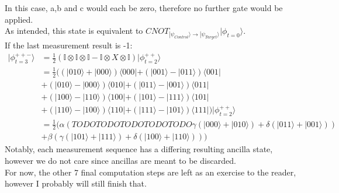In this case, a,b and c would each be zero, therefore no further gate would be applied.\\
As intended, this state is equivalent to 
$CNOT_{|\psi_{Control}\rangle\rightarrow |\psi_{Target}\rangle} |\phi_{t=0}\rangle$.
\\
If the last measurement result is -1:
\begin{align*}
	|\phi^{++-}_{t=3}\rangle 
	&= \frac{1}{2}\left(\mathbb{I}\otimes\mathbb{I}\otimes\mathbb{I}-
	\mathbb{I}\otimes X \otimes \mathbb{I}\right)|\phi^{++}_{t=2}\rangle\\
	&= \frac{1}{2}((|010\rangle + |000\rangle)\langle000|
	+ (|001\rangle-|011\rangle )\langle001|\\
	&+ (|010\rangle-|000\rangle)\langle010|
	+ (|011\rangle-|001\rangle)\langle011|\\
	&+ (|100\rangle-|110\rangle)\langle100|
	+ (|101\rangle-|111\rangle)\langle101|\\
	&+ (|110\rangle-|100\rangle)\langle110|
	+ (|111\rangle-|101\rangle)\langle111|)
	|\phi^{++}_{t=2}\rangle\\
	&= \frac{1}{2}(\alpha \left( 
	TODOTODOTODOTODOTODO
	\gamma (|000\rangle + |010\rangle)+
	\delta (|011\rangle + |001\rangle) \right) \\
	&+ \beta \left( 
	\gamma (|101\rangle + |111\rangle)+
	\delta (|100\rangle + |110\rangle) \right))
\end{align*}
Notably, each measurement sequence has a differing resulting ancilla state, 
however we do not care since ancillas are meant to be discarded.
\\
For now, the other 7 final computation steps are left as an exercise
to the reader, however I probably will still finish that.
